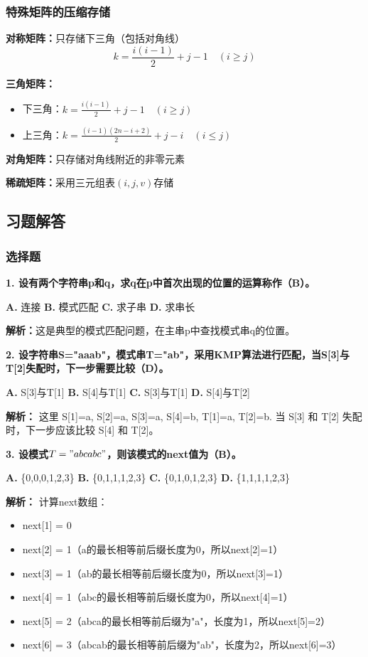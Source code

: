 \documentclass[12pt,a4paper]{amsart}
\begin{document}
\subsubsection{特殊矩阵的压缩存储}

\textbf{对称矩阵：}只存储下三角（包括对角线）
$$k = \frac{i(i-1)}{2} + j-1 \quad (i \geq j)$$

\textbf{三角矩阵：}
\begin{itemize}
\item 下三角：$k = \frac{i(i-1)}{2} + j-1 \quad (i \geq j)$
\item 上三角：$k = \frac{(i-1)(2n-i+2)}{2} + j-i \quad (i \leq j)$
\end{itemize}

\textbf{对角矩阵：}只存储对角线附近的非零元素

\textbf{稀疏矩阵：}采用三元组表$(i, j, v)$存储

\subsection{习题解答}

\subsubsection{选择题}

\textbf{1. 设有两个字符串p和q，求q在p中首次出现的位置的运算称作（B）。}

\textbf{A.} 连接
\textbf{B.} 模式匹配
\textbf{C.} 求子串  
\textbf{D.} 求串长

\textbf{解析：}这是典型的模式匹配问题，在主串p中查找模式串q的位置。

\textbf{2. 设字符串S="aaab"，模式串T="ab"，采用KMP算法进行匹配，当S[3]与T[2]失配时，下一步需要比较（D）。}

\textbf{A.} S[3]与T[1]
\textbf{B.} S[4]与T[1]
\textbf{C.} S[3]与T[1]
\textbf{D.} S[4]与T[2]

\textbf{解析：}
这里 S[1]=a, S[2]=a, S[3]=a, S[4]=b, T[1]=a, T[2]=b. 当 S[3] 和 T[2] 失配时，下一步应该比较 S[4] 和 T[2]。

\textbf{3. 设模式$T="abcabc"$，则该模式的next值为（B）。}

\textbf{A.} \{0,0,0,1,2,3\}
\textbf{B.} \{0,1,1,1,2,3\}
\textbf{C.} \{0,1,0,1,2,3\}
\textbf{D.} \{1,1,1,1,2,3\}

\textbf{解析：}
计算next数组：
\begin{itemize}
\item next[1] = 0
\item next[2] = 1（a的最长相等前后缀长度为0，所以next[2]=1）
\item next[3] = 1（ab的最长相等前后缀长度为0，所以next[3]=1）
\item next[4] = 1（abc的最长相等前后缀长度为0，所以next[4]=1）
\item next[5] = 2（abca的最长相等前后缀为"a"，长度为1，所以next[5]=2）
\item next[6] = 3（abcab的最长相等前后缀为"ab"，长度为2，所以next[6]=3）
\end{itemize}
\end{document}
